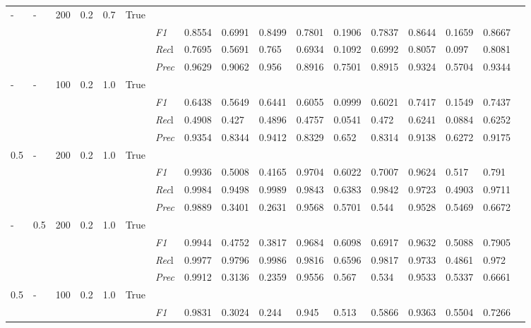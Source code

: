 \begin{table}[]
\begin{tabularx}{\textwidth}{XXXXXX|X|XXX|XXX|XXXX}
    - & - & 200 & 0.2 & 0.7 &True & & & & & & & & & \\
    & & & & & & \textit{F1} & 0.8554 & 0.6991 & 0.8499 & 0.7801 & 0.1906        & 0.7837        & 0.8644        & 0.1659        & 0.8667        \\
    & & & & & & \textit{Rec}l & 0.7695 & 0.5691 & 0.765    & 0.6934 & 0.1092    & 0.6992    & 0.8057    & 0.097    & 0.8081    \\
    & & & & & & \textit{Prec} & 0.9629 & 0.9062 & 0.956 & 0.8916 & 0.7501 & 0.8915 & 0.9324 & 0.5704 & 0.9344 \\ \midrule
    - & - & 100 & 0.2 & 1.0 &True & & & & & & & & & \\
    & & & & & & \textit{F1} & 0.6438 & 0.5649 & 0.6441 & 0.6055 & 0.0999        & 0.6021        & 0.7417        & 0.1549        & 0.7437        \\
    & & & & & & \textit{Rec}l & 0.4908 & 0.427 & 0.4896    & 0.4757 & 0.0541    & 0.472    & 0.6241    & 0.0884    & 0.6252    \\
    & & & & & & \textit{Prec} & 0.9354 & 0.8344 & 0.9412 & 0.8329 & 0.652 & 0.8314 & 0.9138 & 0.6272 & 0.9175 \\ \midrule
    0.5 & - & 200 & 0.2 & 1.0 &True & & & & & & & & & \\
    & & & & & & \textit{F1} & 0.9936 & 0.5008 & 0.4165 & 0.9704 & 0.6022        & 0.7007        & 0.9624        & 0.517        & 0.791        \\
    & & & & & & \textit{Rec}l & 0.9984 & 0.9498 & 0.9989    & 0.9843 & 0.6383    & 0.9842    & 0.9723    & 0.4903    & 0.9711    \\
    & & & & & & \textit{Prec} & 0.9889 & 0.3401 & 0.2631 & 0.9568 & 0.5701 & 0.544 & 0.9528 & 0.5469 & 0.6672 \\ \midrule
    - & 0.5 & 200 & 0.2 & 1.0 &True & & & & & & & & & \\
    & & & & & & \textit{F1} & 0.9944 & 0.4752 & 0.3817 & 0.9684 & 0.6098        & 0.6917        & 0.9632        & 0.5088        & 0.7905        \\
    & & & & & & \textit{Rec}l & 0.9977 & 0.9796 & 0.9986    & 0.9816 & 0.6596    & 0.9817    & 0.9733    & 0.4861    & 0.972    \\
    & & & & & & \textit{Prec} & 0.9912 & 0.3136 & 0.2359 & 0.9556 & 0.567 & 0.534 & 0.9533 & 0.5337 & 0.6661 \\ \midrule
    0.5 & - & 100 & 0.2 & 1.0 &True & & & & & & & & & \\
    & & & & & & \textit{F1} & 0.9831 & 0.3024 & 0.244 & 0.945 & 0.513        & 0.5866        & 0.9363        & 0.5504        & 0.7266        \\

\end{tabularx}
\end{table}
